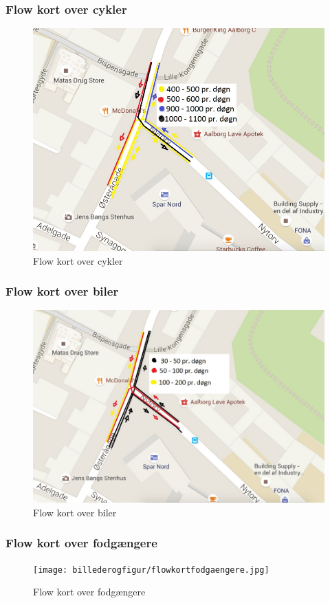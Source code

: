 \subsubsection{Flow kort over cykler}
\begin{figure}[htbp]
   \label{fig:Flowkort_cykler}
   \centering
   \begin{adjustbox}{max width=\textwidth}
     \includegraphics[scale=0.3]{billederogfigur/flowkortcykler.jpg}
  \end{adjustbox}
   \caption{Flow kort over cykler}
 \end{figure}
 \subsubsection{Flow kort over biler}
 \begin{figure}[htbp]
   \label{fig:Flowkort_biler}
   \centering
   \begin{adjustbox}{max width=\textwidth}
     \includegraphics[scale=0.3]{billederogfigur/flowkortbiler.jpg}
  \end{adjustbox}
   \caption{Flow kort over biler}
 \end{figure}
 \subsubsection{Flow kort over fodgængere}
 \begin{figure}[htbp]
   \label{fig:fodgaengere}
   \centering
   \begin{adjustbox}{max width=\textwidth}
     \texttt{[image: billederogfigur/flowkortfodgaengere.jpg]}
  \end{adjustbox}
   \caption{Flow kort over fodgængere}
 \end{figure}
 
